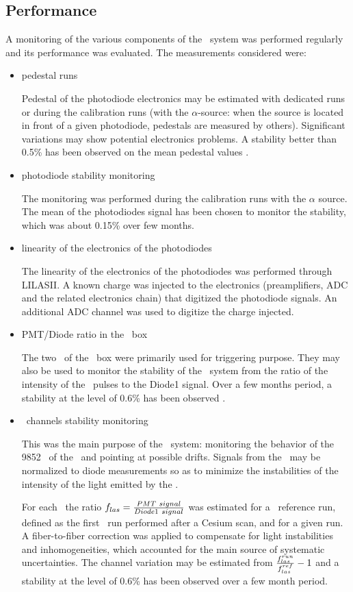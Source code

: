 \subsection{Performance}
A monitoring of the various components of the \lasi~system was performed regularly and its performance was evaluated.  The measurements considered were:
\begin{itemize}
\item{pedestal runs} 
	
	Pedestal of the photodiode electronics may be estimated with dedicated runs or during the calibration runs (with the $\alpha$-source: when the source is located in front of a given photodiode, pedestals are measured by others). Significant variations may show potential electronics problems. A stability better than 0.5\% has been observed on the mean pedestal values \cite{ref:laserb}.
\item{photodiode stability monitoring}
	
	The monitoring was performed during the calibration runs with the $\alpha$ source. The mean of the photodiodes signal has been chosen to monitor the stability, which was about 0.15\% over few months.
	
\item{linearity of the electronics of the photodiodes}
	
	The linearity of the electronics of the photodiodes was performed through {\sc LILASII}. A known charge was injected to the electronics (preamplifiers, ADC and the related electronics chain) that digitized the photodiode signals. An additional ADC channel was used to digitize the charge injected. 
\item{PMT/Diode ratio in the \las~box}
	
	The two \pmts~of the \las~box were primarily used for triggering purpose. They may also be used to monitor the stability of the \las~system from the ratio of the intensity of the \pmts~pulses to the Diode1 signal. Over a few months period, a stability at the level of 0.6\% has been observed \cite{ref:laserb}.
	
\item{\tilecal~channels stability monitoring}
	
	This was the main purpose of the \las~system: monitoring the behavior of the 9852 \pmts~of the \tilecal~and pointing at possible drifts. Signals from the \pmts~may be normalized to diode measurements so as to minimize the instabilities of the intensity of the light emitted by the \las.  \par
	For each \pmt~the ratio $f_{las}={{PMT~signal}\over{Diode1~signal}}$ was estimated for a \las~reference run, defined as the first \las~run performed after a Cesium scan, and for a given run. A fiber-to-fiber correction was applied to compensate for light instabilities and inhomogeneities, which accounted for the main source of systematic uncertainties. The channel variation may be estimated from ${{f_{las}^{run}}\over{f_{las}^{ref}}}-1$ and a stability at the level of 0.6\% has been observed over a few month period.
	
	
\end{itemize}


